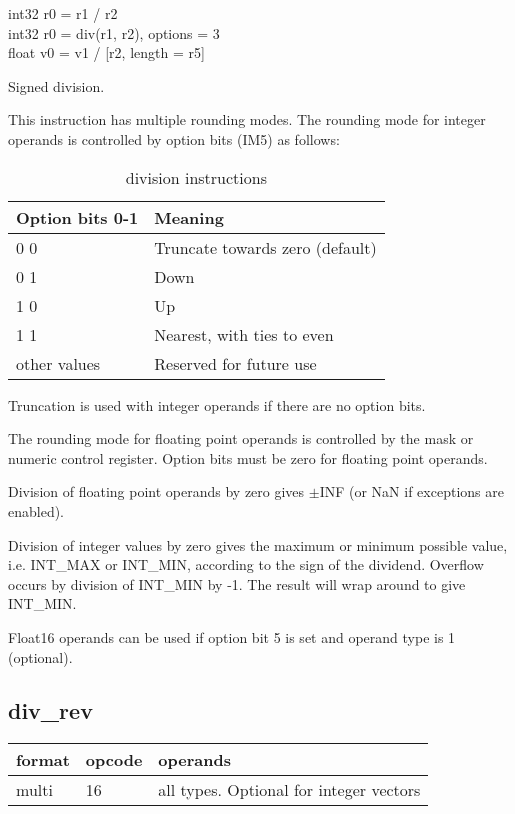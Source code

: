 \documentclass[forwardcom.tex]{subfiles}
\begin{document}
int32 r0 = r1 / r2 \\
int32 r0 = div(r1, r2), options = 3\\
float v0 = v1 / [r2, length = r5]
\vv

Signed division.

\vv
This instruction has multiple rounding modes. The rounding mode for integer operands is controlled by option bits (IM5) as follows:

\begin{longtable} {|p{25mm}|p{80mm}|}
\caption{division instructions} 
\label{table:DivInstructions} \\
\endfirsthead
\endhead
\hline
\bfseries Option bits 0-1 & \bfseries Meaning   \\
\hline
 0 0 & Truncate towards zero (default) \\
 0 1 & Down \\
 1 0 & Up \\
 1 1 & Nearest, with ties to even \\
\hline
other values & Reserved for future use \\ 
\hline
\end{longtable}
Truncation is used with integer operands if there are no option bits.

\vv
The rounding mode for floating point operands is controlled by the mask or numeric control register. Option bits must be zero for floating point operands.

\vv
Division of floating point operands by zero gives $\pm$INF (or NaN if exceptions are enabled).
\vv

Division of integer values by zero gives the maximum or minimum possible value, i.e. INT\_MAX or INT\_MIN, according to the sign of the dividend. 
Overflow occurs by division of INT\_MIN by -1. The result will wrap around to give INT\_MIN.
\vv

Float16 operands can be used if option bit 5 is set and operand type is 1 (optional).
\vv


\subsection{div\_rev}
\label{table:divRevInstruction}
\begin{tabular}{|p{12mm}|p{15mm}|p{100mm}|}
\hline
\bfseries format & \bfseries opcode & \bfseries operands \\ \hline
multi & 16 & all types. Optional for integer vectors \\ \hline
\end{tabular}
\vv
\end{document}
